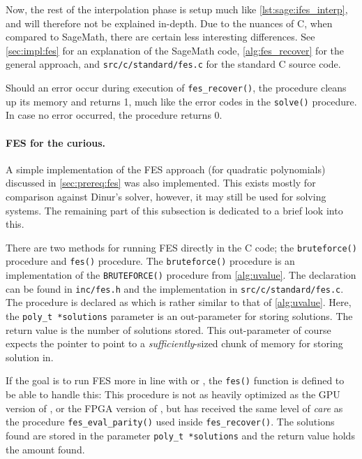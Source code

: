 Now, the rest of the interpolation phase is setup much like \cref{lst:sage:ifes_interp}, and will therefore not be explained in-depth. Due to the nuances of C, when compared to SageMath, there are certain less interesting differences. See \cref{sec:impl:fes} for an explanation of the SageMath code, \cref{alg:fes_recover} for the general approach, and \texttt{src/c/standard/fes.c} for the standard C source code.

Should an error occur during execution of \texttt{fes\_recover()}, the procedure cleans up its memory and returns 1, much like the error codes in the \texttt{solve()} procedure. In case no error occurred, the procedure returns 0.

\paragraph{FES for the curious.} A simple implementation of the FES approach (for quadratic polynomials) discussed in \cref{sec:prereq:fes} was also implemented. This exists mostly for comparison against Dinur's solver, however, it may still be used for solving systems. The remaining part of this subsection is dedicated to a brief look into this.

There are two methods for running FES directly in the C code; the \texttt{bruteforce()} procedure and \texttt{fes()} procedure. The \texttt{bruteforce()} procedure is an implementation of the \texttt{BRUTEFORCE()} procedure from \cref{alg:uvalue}. The declaration can be found in \texttt{inc/fes.h} and the implementation in \texttt{src/c/standard/fes.c}. The procedure is declared as 
which is rather similar to that of \cref{alg:uvalue}. Here, the \texttt{poly\_t *solutions} parameter is an out-parameter for storing solutions. The return value is the number of solutions stored. This out-parameter of course expects the pointer to point to a \textit{sufficiently}-sized chunk of memory for storing solution in.

If the goal is to run FES more in line with \cite{cryptoeprint:2013/436} or \cite{ches-2010-23990}, the \texttt{fes()} function is defined to be able to handle this:
This procedure is not as heavily optimized as the GPU version of \cite{ches-2010-23990}, or the FPGA version of \cite{cryptoeprint:2013/436}, but has received the same level of \textit{care} as the procedure \texttt{fes\_eval\_parity()} used inside \texttt{fes\_recover()}. The solutions found are stored in the parameter \texttt{poly\_t *solutions} and the return value holds the amount found.

